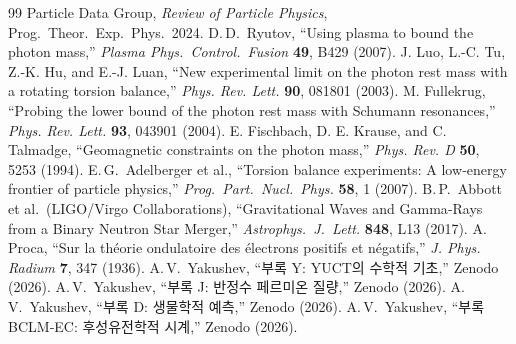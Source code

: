 \documentclass[11pt,a4paper]{article}
\begin{document}
	\begin{thebibliography}{99}
		 Particle Data Group, \emph{Review of Particle Physics}, Prog.\ Theor.\ Exp.\ Phys.\ 2024.
		 D.\,D.\ Ryutov, ``Using plasma to bound the photon mass,'' \emph{Plasma Phys.\ Control.\ Fusion} \textbf{49}, B429 (2007).
		 J. Luo, L.-C. Tu, Z.-K. Hu, and E.-J. Luan, ``New experimental limit on the photon rest mass with a rotating torsion balance,'' \emph{Phys. Rev. Lett.} \textbf{90}, 081801 (2003).
		 M. Fullekrug, ``Probing the lower bound of the photon rest mass with Schumann resonances,'' \emph{Phys. Rev. Lett.} \textbf{93}, 043901 (2004).
		 E. Fischbach, D. E. Krause, and C. Talmadge, ``Geomagnetic constraints on the photon mass,'' \emph{Phys. Rev. D} \textbf{50}, 5253 (1994).
		 E.\,G.\ Adelberger et al., ``Torsion balance experiments: A low‑energy frontier of particle physics,'' \emph{Prog.\ Part.\ Nucl.\ Phys.} \textbf{58}, 1 (2007).
		 B.\,P.\ Abbott et al.\ (LIGO/Virgo Collaborations), ``Gravitational Waves and Gamma‑Rays from a Binary Neutron Star Merger,'' \emph{Astrophys.\ J.\ Lett.} \textbf{848}, L13 (2017).
		 A. Proca, ``Sur la théorie ondulatoire des électrons positifs et négatifs,'' \emph{J. Phys. Radium} \textbf{7}, 347 (1936).
		 A.\,V.\ Yakushev, ``부록 Y: YUCT의 수학적 기초,'' Zenodo (2026).
		 A.\,V.\ Yakushev, ``부록 J: 반정수 페르미온 질량,'' Zenodo (2026).
		 A.\,V.\ Yakushev, ``부록 D: 생물학적 예측,'' Zenodo (2026).
		 A.\,V.\ Yakushev, ``부록 BCLM‑EC: 후성유전학적 시계,'' Zenodo (2026).
	\end{thebibliography}
	
\end{document}
